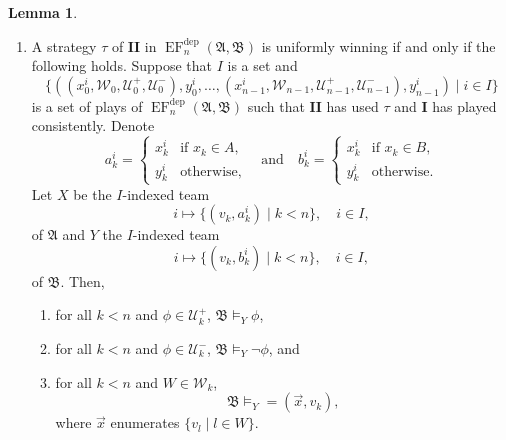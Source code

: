 \documentclass[12pt]{article}
\theoremstyle{definition}
\newtheorem{lemma}[definition]{Lemma}
\newcommand{\playerone}{\mathrm{\mathbf{I}}}
\newcommand{\playertwo}{\mathrm{\mathbf{II}}}
\DeclareMathOperator{\EF}{EF}
\newcommand{\EFdep}{\EF^{\mathrm{dep}}}
\newcommand{\W}{\mathcal W}
\newcommand{\U}{\mathcal U}
\newcommand{\A}{\mathfrak{A}}
\newcommand{\B}{\mathfrak{B}}
\newcommand{\dep}{\mathop{=}}
\begin{document}
\begin{lemma}
\begin{enumerate}
        \item A strategy $\tau$ of $\playertwo$ in $\EFdep_n(\A,\B)$ is uniformly winning if and only if the following holds. Suppose that $I$ is a set and
        \[
            \{ ((x_0^i,\W_0,\U^+_0,\U^-_0),y_0^i,\dots,(x_{n-1}^i,\W_{n-1},\U^+_{n-1},\U^-_{n-1}),y_{n-1}^i) \mid i\in I \}
        \]
        is a set of plays of $\EFdep_n(\A,\B)$ such that $\playertwo$ has used $\tau$ and $\playerone$ has played consistently. Denote
        \[
            a_k^i =
            \begin{cases}
                x_k^i & \text{if $x_k\in A$}, \\
                y_k^i & \text{otherwise},
            \end{cases}
            \quad\text{and}\quad
            b_k^i =
            \begin{cases}
                x_k^i & \text{if $x_k\in B$}, \\
                y_k^i & \text{otherwise}.
            \end{cases}
        \]
        Let $X$ be the $I$-indexed team
        \[
            i\mapsto\{(v_k,a^i_k) \mid k<n\}, \quad i\in I,
        \]
        of $\A$ and $Y$ the $I$-indexed team
        \[
            i\mapsto\{(v_k,b^i_k) \mid k<n\}, \quad i\in I,
        \]
        of $\B$. Then,
        \begin{enumerate}
            \item for all $k<n$ and $\phi\in\U^+_k$, $\B\models_Y\phi$,
            \item for all $k<n$ and $\phi\in\U^-_k$, $\B\models_Y\neg\phi$, and
            \item for all $k<n$ and $W\in\W_k$,
            \[
                \B\models_Y\dep(\vec x,v_k),
            \]
            where $\vec x$ enumerates $\{v_l \mid l\in W\}$.
        \end{enumerate}
    \end{enumerate}
\end{lemma}
\end{document}
